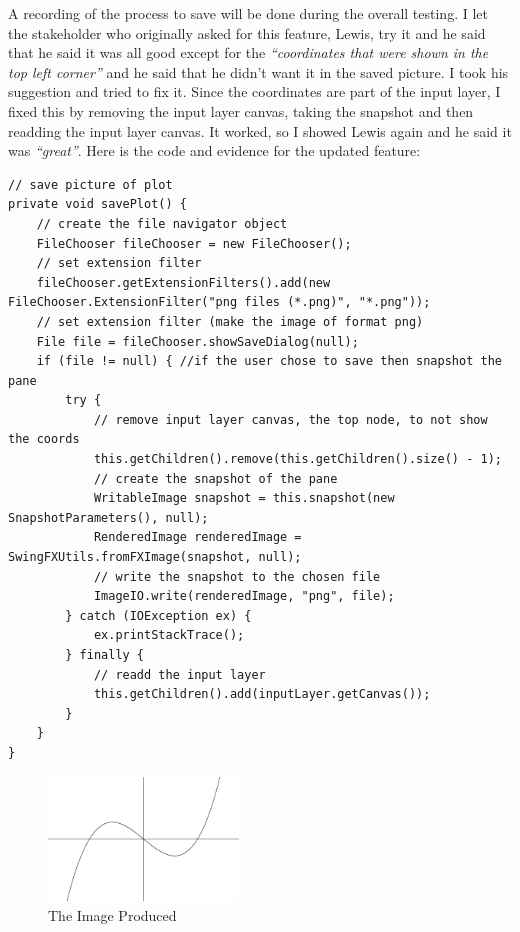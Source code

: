\documentclass[../../../../main.tex]{subfiles}
\begin{document}
A recording of the process to save will be done during the overall testing.
\newpage\noindent
I let the stakeholder who originally asked for this feature, Lewis, try it and he said that he said it was all good except for the \textit{``coordinates that were shown in the top left corner''} and he said that he didn't want it in the saved picture. I took his suggestion and tried to fix it. Since the coordinates are part of the input layer, I fixed this by removing the input layer canvas, taking the snapshot and then readding the input layer canvas. It worked, so I showed Lewis again and he said it was \textit{``great''}. Here is the code and evidence for the updated feature:
\begin{verbatim}
// save picture of plot
private void savePlot() {
	// create the file navigator object
	FileChooser fileChooser = new FileChooser();
	// set extension filter
	fileChooser.getExtensionFilters().add(new FileChooser.ExtensionFilter("png files (*.png)", "*.png"));
	// set extension filter (make the image of format png)
	File file = fileChooser.showSaveDialog(null);
	if (file != null) {	//if the user chose to save then snapshot the pane
		try {
			// remove input layer canvas, the top node, to not show the coords
			this.getChildren().remove(this.getChildren().size() - 1);
			// create the snapshot of the pane
			WritableImage snapshot = this.snapshot(new SnapshotParameters(), null);
			RenderedImage renderedImage = SwingFXUtils.fromFXImage(snapshot, null);
			// write the snapshot to the chosen file
			ImageIO.write(renderedImage, "png", file);
		} catch (IOException ex) {
			ex.printStackTrace();
		} finally {
			// readd the input layer
			this.getChildren().add(inputLayer.getCanvas());
		}
	}
}
\end{verbatim}
\begin{figure}[H]
	\centering
	\includegraphics[width=0.45\textwidth]{images/withoutCoords}
	\caption{The Image Produced}
\end{figure}
\end{document}
